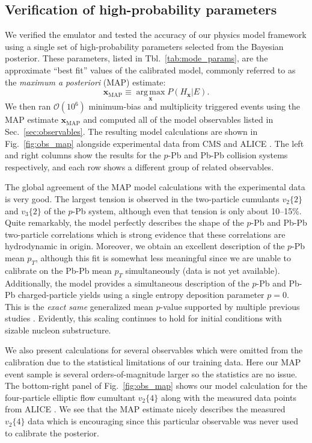\documentclass[aps,prc,reprint,amsmath,nofootinbib]{revtex4-1}
\newcommand{\x}{\mathbf{x}}
\newcommand{\vnk}[2]{v_#1\{#2\}}
\newcommand{\order}[1]{$\mathcal O(10^{#1})$}
\begin{document}
\subsection{Verification of high-probability parameters}

We verified the emulator and tested the accuracy of our physics model framework using a single set of high-probability parameters selected from the Bayesian posterior.
These parameters, listed in Tbl.~\ref{tab:mode_params}, are the approximate ``best fit'' values of the calibrated model, commonly referred to as the \emph{maximum a posteriori} (MAP) estimate:
\begin{equation}
  \x_\mathrm{MAP} \equiv \operatorname*{arg\, max}_{\x} P(H_\x | E).
\end{equation}
We then ran \order{6} minimum-bias and multiplicity triggered events using the MAP estimate $\x_\mathrm{MAP}$ and computed all of the model observables listed in Sec.~\ref{sec:observables}.
The resulting model calculations are shown in Fig.~\ref{fig:obs_map} alongside experimental data from CMS \cite{Chatrchyan:2013nka} and ALICE \cite{Adam:2015ptt, Adam:2016izf, Adam:2014qja, Abelev:2013bla}.
The left and right columns show the results for the $p$-Pb and Pb-Pb collision systems respectively, and each row shows a different group of related observables.

The global agreement of the MAP model calculations with the experimental data is very good.
The largest tension is observed in the two-particle cumulants $\vnk{2}{2}$ and $\vnk{3}{2}$ of the $p$-Pb system, although even that tension is only about 10--15\%.
Quite remarkably, the model perfectly describes the shape of the $p$-Pb and Pb-Pb two-particle correlations which is strong evidence that these correlations are hydrodynamic in origin.
Moreover, we obtain an excellent description of the \mbox{$p$-Pb} mean $p_T$, although this fit is somewhat less meaningful since we are unable to calibrate on the Pb-Pb mean $p_T$ simultaneously (data is not yet available).
Additionally, the model provides a simultaneous description of the \mbox{$p$-Pb} and Pb-Pb charged-particle yields using a single entropy deposition parameter $p=0$.
This is the \emph{exact same} generalized mean $p$-value supported by multiple previous studies \cite{Moreland:2014oya, Bernhard:2016tnd, Ke:2016jrd, Bernhard:2018hnz}.
Evidently, this scaling continues to hold for initial conditions with sizable nucleon substructure.

We also present calculations for several observables which were omitted from the calibration due to the statistical limitations of our training data.
Here our MAP event sample is several orders-of-magnitude larger so the statistics are no issue.
The bottom-right panel of Fig.~\ref{fig:obs_map} shows our model calculation for the four-particle elliptic flow cumultant $\vnk{2}{4}$ along with the measured data points from \mbox{ALICE} \cite{Adam:2016izf}.
We see that the MAP estimate nicely describes the measured $\vnk{2}{4}$ data which is encouraging since this particular observable was never used to calibrate the posterior.
\end{document}
